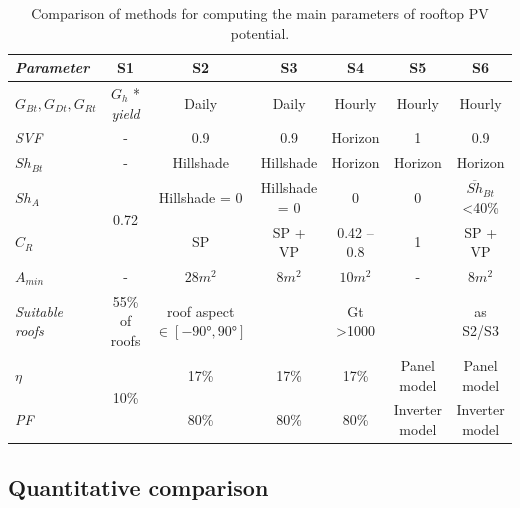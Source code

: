 \begin{table}[htb]
\centering
\footnotesize
\caption{Comparison of methods for computing the main parameters of rooftop PV potential.}
\label{tab:compare_methods}
\begin{tabular}{lcccccc}
\hline
\textit{\textbf{Parameter}} & \textbf{S1}           & \textbf{S2}                     & \textbf{S3}   & \textbf{S4}          & \textbf{S5}    & \textbf{S6}         \\ \hline
$G_{Bt}, G_{Dt}, G_{Rt}$               & $G_h$ * \textit{yield}            & Daily                           & Daily         & Hourly               & Hourly         & Hourly              \\
\textit{SVF}                & -                     & 0.9                             & 0.9           & Horizon              & 1              & 0.9                 \\
$Sh_{Bt}$                        & -                     & Hillshade                       & Hillshade     & Horizon              & Horizon        & Horizon             \\
$Sh_A$                         & \multirow{2}{*}{0.72} & Hillshade = 0                   & Hillshade = 0 & 0                    & 0              & $\overline{Sh}_{Bt}$ \textless   40\% \\
$C_R$                          &                       & SP                              & SP + VP       & 0.42 – 0.8           & 1              & SP + VP             \\
$A_{min}$                        & -                     & $28 m^2$                            & $8 m^2$           & $10 m^2$                 & -              & $8 m^2$                 \\
\textit{Suitable roofs}     & 55\% of roofs         & roof aspect $\in [-90°,   90°]$ &               & Gt \textgreater 1000 &                & as S2/S3            \\
$\eta$                      & \multirow{2}{*}{10\%} & 17\%                            & 17\%          & 17\%                 & Panel model    & Panel model         \\
\textit{PF}                 &                       & 80\%                            & 80\%          & 80\%                 & Inverter model & Inverter model      \\ \hline
\end{tabular}
\end{table}

\subsection{Quantitative comparison}

